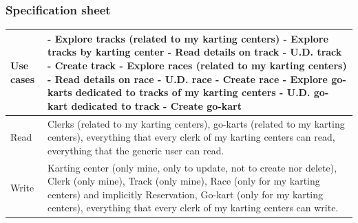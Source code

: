 \documentclass{beamer}
\begin{document}
\begin{frame}
\frametitle{Specification sheet}
\begin{table}
    \tiny
    \begin{tabular}{|p{2cm}|p{6cm}|}
    \hline
    Use cases &
    - Explore tracks (related to my karting centers)\newline
    - Explore tracks by karting center \newline
    - Read details on track \newline
    - U.D. track \newline
    - Create track \newline
    - Explore races (related to my karting centers) \newline
    - Read details on race \newline
    - U.D. race \newline
    - Create race \newline
    - Explore go-karts dedicated to tracks of my karting centers \newline
    - U.D. go-kart dedicated to track \newline
    - Create go-kart \\
    \hline
    Read & Clerks (related to my karting centers), go-karts (related to my karting centers), 
    everything that every clerk of my karting centers can read,
    everything that the generic user can read. \\
    \hline
    Write & Karting center (only mine, only to update, not to create nor delete), 
    Clerk (only mine), Track (only mine), Race (only for my karting centers) and implicitly Reservation, 
    Go-kart (only for my karting centers),
    everything that every clerk of my karting centers can write. \\
    \hline
    \end{tabular}
\end{table}
\end{frame}
\end{document}
